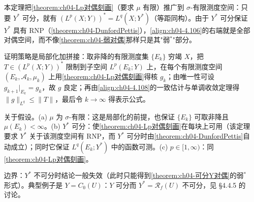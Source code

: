 \documentclass[../../main.tex]{subfiles}%
\begin{document}
\begin{remark}\label{remark:ch04-可分对偶Lp对偶}
本定理把\cref{theorem:ch04-Lp对偶刻画}（要求 $\mu$ 有限）推广到 $\sigma$-有限测度空间：只要 $Y^*$ 可分，就有 $(L^p(X;Y))^*=L^q(X;Y^*)$（等距同构）。由于 $Y^*$ 可分保证 $Y^*$ 具有 RNP（\cref{theorem:ch04-DunfordPettis}），\eqref{align:ch04-4.106}的右端就是全部对偶空间，而不像\cref{theorem:ch04-弱对偶}那样只是其"弱$^*$"部分。

证明策略是局部化加拼接：取非降的有限测度集 $\{E_k\}$ 穷竭 $X$，把 $T\in(L^p(X;Y))^*$ 限制到子空间 $L^p(E_k;Y)$ 上，在每个有限测度空间 $(E_k,\mathcal{A}_k,\mu_k)$ 上用\cref{theorem:ch04-Lp对偶刻画}得核 $g_k$；由唯一性可设 $g_{k+1}|_{E_k}=g_k$，故 $g$ 良定；再由\eqref{align:ch04-4.108}的一致估计与单调收敛定理得 $\|g\|_{L^q}\leqslant\|T\|$，最后令 $k\to\infty$ 得表示公式。

关于假设。(a) $\mu$ 为 $\sigma$-有限：这是局部化的前提，也保证 $\{E_k\}$ 可取非降且 $\mu(E_k)<\infty$。(b) $Y^*$ 可分：使\cref{theorem:ch04-Lp对偶刻画}在每块上可用（该定理要求 $Y^*$ 关于该测度空间有 RNP，而 $Y^*$ 可分时由\cref{theorem:ch04-DunfordPettis}自动成立）；同时它保证 $L^q(E_k;Y^*)$ 中的函数可测。(c) $p\in[1,\infty)$：同\cref{theorem:ch04-Lp对偶刻画}。

边界：$Y^*$ 不可分时结论一般失效（此时只能得到\cref{theorem:ch04-可分Y对偶}的弱$^*$形式）。典型例子是 $Y=C_0(U)$：$Y$ 可分而 $Y^*=\mathscr{R}_f(U)$ 不可分，见 §4.4.5 的讨论。
\end{remark}
\end{document}
